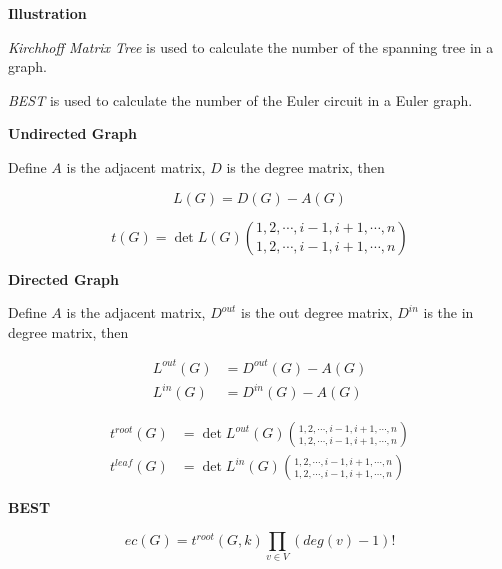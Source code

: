 \noindent\textbf{Illustration}

\textit{Kirchhoff Matrix Tree} is used to calculate the number of the spanning tree in a graph.

\textit{BEST} is used to calculate the number of the Euler circuit in a Euler graph.

\noindent\textbf{Undirected Graph}

Define $A$ is the adjacent matrix, $D$ is the degree matrix, then

\begin{equation*}
L(G) = D(G) - A(G)
\end{equation*}

\begin{equation*}
t(G) = \det L(G) \binom{1, 2, \cdots, i - 1, i + 1, \cdots, n}{1, 2, \cdots, i - 1, i + 1, \cdots, n}
\end{equation*}

\noindent\textbf{Directed Graph}

Define $A$ is the adjacent matrix, $D^{out}$ is the out degree matrix, $D^{in}$ is the in degree matrix, then

\begin{equation*}
\begin{aligned}
L^{out}(G) &= D^{out}(G) - A(G) \\
L^{in}(G) &= D^{in}(G) - A(G)
\end{aligned}
\end{equation*}

\begin{equation*}
\begin{aligned}
t^{root}(G) &= \det L^{out}(G) \binom{1, 2, \cdots, i - 1, i + 1, \cdots, n}{1, 2, \cdots, i - 1, i + 1, \cdots, n} \\
t^{leaf}(G) &= \det L^{in}(G) \binom{1, 2, \cdots, i - 1, i + 1, \cdots, n}{1, 2, \cdots, i - 1, i + 1, \cdots, n}
\end{aligned}
\end{equation*}

\noindent\textbf{BEST}

\begin{equation*}
ec(G) = t^{root}(G, k) \prod_{v\in V}(deg(v) - 1)!
\end{equation*}

